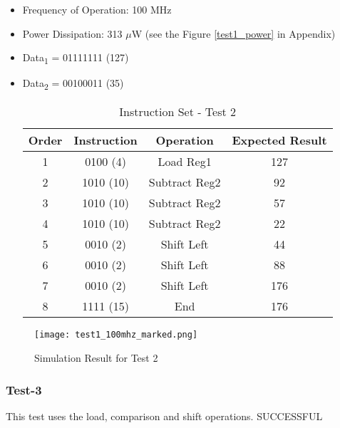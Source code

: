 \documentclass[12pt]{article}
\begin{document}
\begin{itemize}
\item Frequency of Operation: 100 MHz
\item Power Dissipation: 313 $\mu$W (see the Figure \ref{test1_power} in Appendix)
\item Data\textsubscript{1} = 01111111 (127) 
\item Data\textsubscript{2} = 00100011 (35) 
\begin{table}[h]
\centering
\begin{tabular}{|c|c|c|c|}
\hline 
Order & Instruction & Operation & Expected Result \\ 
\hline 
1 & 0100 (4) & Load Reg1 & 127 \\ 
\hline 
2 & 1010 (10) & Subtract Reg2 & 92 \\ 
\hline 
3 & 1010 (10) & Subtract Reg2 & 57 \\ 
\hline 
4 & 1010 (10) & Subtract Reg2 & 22 \\ 
\hline 
5 & 0010 (2) & Shift Left & 44 \\ 
\hline 
6 & 0010 (2) & Shift Left & 88 \\ 
\hline 
7 & 0010 (2) & Shift Left & 176 \\ 
\hline 
8 & 1111 (15) & End & 176 \\ 
\hline 
\end{tabular} 
\caption{Instruction Set - Test 2}
\end{table}
\end{itemize}


\begin{figure}[H]
\centering
\texttt{[image: test1\_100mhz\_marked.png]}
\caption{Simulation Result for Test 2}
\label{test2}
\end{figure}





\subsubsection*{Test-3} %
This test uses the load, comparison and shift operations. \color{Green} SUCCESSFUL \color{Black}
\end{document}
